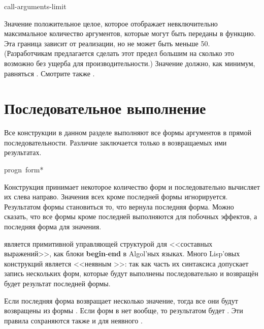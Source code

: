 \begin{defun}[Constant]
call-arguments-limit

Значение  положительное целое, которое отображает
невключительно максимальное количество аргументов, которые могут быть переданы в
функцию. Эта граница зависит от реализации, но не может быть меньше 50.
(Разработчикам предлагается сделать этот предел большим на сколько это возможно
без ущерба для производительности.)
Значение  должно, как минимум, равняться
.
Смотрите также .
\end{defun}

\section{Последовательное выполнение}

Все конструкции в данном разделе выполняют все формы аргументов в прямой
последовательности. Различие заключается только в возвращаемых ими результатах.

\begin{defspec}
progn {\,form}*

Конструкция  принимает некоторое количество форм и последовательно
вычисляет их слева направо. Значения всех кроме последней формы
игнорируется. Результатом формы  становиться то, что вернула
последняя форма.
Можно сказать, что все формы кроме последней выполняются для побочных эффектов,
а последняя форма для значения.

 является примитивной управляющей структурой для <<составных
выражений>>, как блоки \textbf{begin}-\textbf{end} в Algol'ных языках.
Много Lisp'овых конструкций является <<неявным >>:
так как часть их синтаксиса допускает запись нескольких форм,
которые будут выполнены последовательно и возвращён будет результат последней
формы.

Если последняя форма  возвращает несколько значение, тогда все они
будут возвращены из формы . Если форм в  нет вообще, то
результатом будет {\false}. Эти правила сохраняются также и для неявного
.
\end{defspec}

